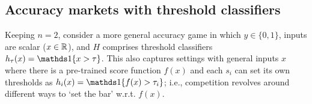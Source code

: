 









\subsection{Accuracy markets with threshold classifiers} \label{sec:2xH}
Keeping $n=2$,
consider a more general accuracy game
in which $y \in \{0,1\}$, inputs are scalar ($x \in \mathbb{R}$),
and $H$ comprises threshold classifiers $h_\tau(x)=\one{x > \tau}$.
This also captures settings with general inputs $x$
where there is a pre-trained score function $f(x)$
and each $s_i$ can set its own thresholds as $h_i(x)=\one{f(x) > \tau_i}$;
i.e., competition revolves around different ways to `set the bar' w.r.t. $f(x)$.
 

